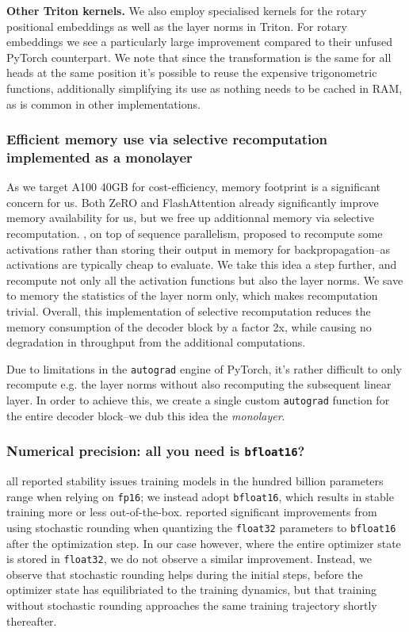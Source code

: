 \documentclass{article}
\begin{document}
\textbf{Other Triton kernels.} We also employ specialised kernels for the rotary positional embeddings as well as the layer norms in Triton. For rotary embeddings we see a particularly large improvement compared to their unfused PyTorch counterpart. We note that since the transformation is the same for all heads at the same position it's possible to reuse the expensive trigonometric functions, additionally simplifying its use as nothing needs to be cached in RAM, as is common in other implementations.

\subsubsection{Efficient memory use via selective recomputation implemented as a monolayer}
\label{selective_recomputation}

As we target A100 40GB for cost-efficiency, memory footprint is a significant concern for us. Both ZeRO and FlashAttention already significantly improve memory availability for us, but we free up additionnal memory via selective recomputation. \citet{seq_parallel}, on top of sequence parallelism, proposed to recompute some activations rather than storing their output in memory for backpropagation--as activations are typically cheap to evaluate. We take this idea a step further, and recompute not only all the activation functions but also the layer norms. We save to memory the statistics of the layer norm only, which makes recomputation trivial. Overall, this implementation of selective recomputation reduces the memory consumption of the decoder block by a factor 2x, while causing no degradation in throughput from the additional computations.  

Due to limitations in the \texttt{autograd} engine of PyTorch, it's rather difficult to only recompute e.g. the layer norms without also recomputing the subsequent linear layer. In order to achieve this, we create a single custom \texttt{autograd} function for the entire decoder block--we dub this idea the \textit{monolayer}.

\subsubsection{Numerical precision: all you need is \texttt{bfloat16}?}

\citet{brown2020gpt3, zhang2022opt, bloom} all reported stability issues training models in the hundred billion parameters range when relying on \texttt{fp16}; we instead adopt \texttt{bfloat16}, which results in stable training more or less out-of-the-box. \citet{gopher} reported significant improvements from using stochastic rounding when quantizing the \texttt{float32} parameters to \texttt{bfloat16} after the optimization step. In our case however, where the entire optimizer state is stored in \texttt{float32}, we do not observe a similar improvement. Instead, we observe that stochastic rounding helps during the initial steps, before the optimizer state has equilibriated to the training dynamics, but that training without stochastic rounding approaches the same training trajectory shortly thereafter. 
\end{document}

